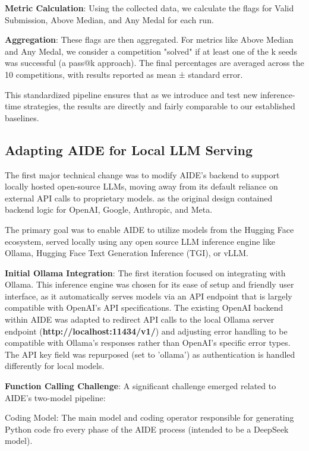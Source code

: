 \textbf{Metric Calculation}: Using the collected data, we calculate the flags for Valid Submission, Above Median, and Any Medal for each run.

\textbf{Aggregation}: These flags are then aggregated. For metrics like Above Median and Any Medal, we consider a competition "solved" if at least one of the k seeds was successful (a pass@k approach). The final percentages are averaged across the 10 competitions, with results reported as mean ± standard error.

This standardized pipeline ensures that as we introduce and test new inference-time strategies, the results are directly and fairly comparable to our established baselines.


\subsection{Adapting AIDE for Local LLM Serving}

The first major technical change was to modify AIDE's backend to support locally hosted open-source LLMs, moving away from its default reliance on external API calls to proprietary models. as the original design contained backend logic for OpenAI, Google, Anthropic, and Meta.

The primary goal was to enable AIDE to utilize models from the Hugging Face ecosystem, served locally using any open source LLM inference engine like Ollama, Hugging Face Text Generation Inference (TGI), or vLLM.

\textbf{Initial Ollama Integration}: The first iteration focused on integrating with Ollama. This inference engine was chosen for its ease of setup and friendly user interface, as it automatically serves models via an API endpoint that is largely compatible with OpenAI's API specifications. The existing OpenAI backend within AIDE was adapted to redirect API calls to the local Ollama server endpoint (\textbf{http://localhost:11434/v1/}) and adjusting error handling to be compatible with Ollama's responses rather than OpenAI's specific error types. The API key field was repurposed (set to 'ollama') as authentication is handled differently for local models.

\textbf{Function Calling Challenge}: A significant challenge emerged related to AIDE's two-model pipeline:

Coding Model: The main model and coding operator responsible for generating Python code fro every phase of the AIDE process (intended to be a DeepSeek model).

